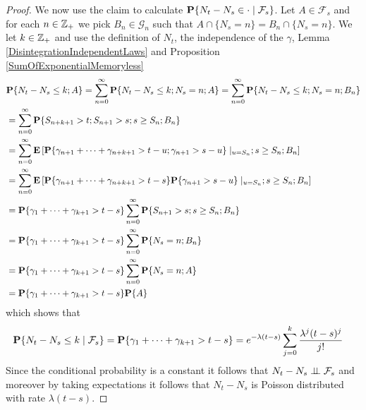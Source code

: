 \begin{proof}
We now use the claim to calculate  $\cprobability{\mathcal{F}_s}{N_t
  - N_s \in \cdot}$.  Let $A \in \mathcal{F}_s$ and for each $n \in \integers_+$
we pick $B_n \in \mathcal{G}_n$ such that $A \cap \lbrace N_s = n
\rbrace = B_n \cap \lbrace N_s = n \rbrace$.  We let $k \in
\integers_+$ and use the definition of $N_t$, the independence of the
$\gamma$, Lemma \ref{DisintegrationIndependentLaws} and Proposition \ref{SumOfExponentialMemoryless}
\begin{align*}
  &\probability{N_t - N_s \leq k; A} 
    = \sum_{n=0}^\infty \probability{N_t - N_s \leq k; N_s = n ; A} 
    =\sum_{n=0}^\infty \probability{N_t- N_s \leq k; N_s = n ; B_n}  \\
  &=\sum_{n=0}^\infty \probability{S_{n+k+1} > t; S_{n+1} > s; s \geq S_n ; B_n}  \\
  &=\sum_{n=0}^\infty \expectation{\probability{\gamma_{n+1} + \dotsb
    + \gamma_{n+k+1} > t-u; \gamma_{n+1} > s-u}\mid_{u=S_n}; s \geq S_n ; B_n}  \\
  &=\sum_{n=0}^\infty \expectation{\probability{\gamma_{n+1} + \dotsb
    + \gamma_{n+k+1} > t-s}\probability{\gamma_{n+1} > s-u}\mid_{u=S_n}; s \geq S_n ; B_n}  \\
  &=\probability{\gamma_{1} + \dotsb
    + \gamma_{k+1} > t-s} \sum_{n=0}^\infty \probability{S_{n+1} > s; s \geq S_n ; B_n}  \\
  &=\probability{\gamma_{1} + \dotsb
    + \gamma_{k+1} > t-s} \sum_{n=0}^\infty \probability{N_s=n ; B_n}  \\
  &=\probability{\gamma_{1} + \dotsb
    + \gamma_{k+1} > t-s} \sum_{n=0}^\infty \probability{N_s=n ; A}  \\
  &=\probability{\gamma_{1} + \dotsb
    + \gamma_{k+1} > t-s} \probability{A}  \\
\end{align*}
which shows that 
\begin{align*}
\cprobability{\mathcal{F}_s}{N_t  - N_s \leq k} 
&= \probability{\gamma_{1} + \dotsb  + \gamma_{k+1} > t-s}
= e^{-\lambda(t-s)} \sum_{j=0}^{k} \frac{\lambda^j(t-s)^j}{j!}
\end{align*}
Since the conditional probability is a constant it follows that $N_t -
N_s \Independent \mathcal{F}_s$ and moreover by taking expectations it
follows that $N_t - N_s$ is
Poisson distributed with rate $\lambda(t-s)$.
\end{proof}

